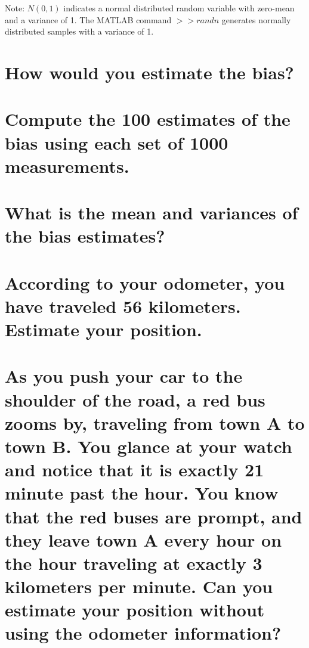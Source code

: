 \documentclass[12pt,letterpaper, onecolumn]{exam}
\begin{document}
\begin{questions}
{        Note: $N(0,1)$ indicates a normal distributed random variable with zero-mean and a variance of 1. The MATLAB command $>>randn$ generates normally distributed samples with a variance of 1.}
    \clearpage
    \begin{parts}
        \part{How would you estimate the bias?}

        \part{Compute the 100 estimates of the bias using each set of 1000 measurements.}

        \part{What is the mean and variances of the bias estimates?}
    \end{parts}
    \clearpage
    \begin{parts}
        \part{According to your odometer, you have traveled 56 kilometers. Estimate your position.}
        \part{As you push your car to the shoulder of the road, a red bus zooms by, traveling from town \textbf{A} to town \textbf{B}. You glance at your watch and notice that it is exactly 21 minute past the hour. You know that the red buses are prompt, and they leave town \textbf{A} every hour on the hour traveling at exactly 3 kilometers per minute. Can you estimate your position without using the odometer information?}

\end{parts}
\end{questions}
\end{document}
